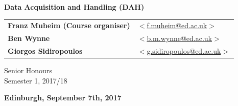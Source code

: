 \vspace{1cm}

\begin{center}
\end{center}

\vspace{1cm}

\begin{center}
{\LARGE\bf Data Acquisition and Handling (DAH)}
\end{center}

\begin{center}

\vspace{2cm}

\begin{tabular}{ll}
{\Large{\bf Franz Muheim (Course organiser)}} & \hspace*{5mm}\href{mailto:f.muheim@ed.ac.uk}{$<$f.muheim@ed.ac.uk$>$} \\
{\Large {\bf Ben Wynne} } & \hspace*{5mm} \href{mailto:b.m.wynne@ed.ac.uk}{$<$b.m.wynne@ed.ac.uk$>$} \\

{\Large{\bf Giorgos Sidiropoulos} }& \hspace*{5mm} \href{mailto:g.sidiropoulos@ed.ac.uk}{$<$g.sidiropoulos@ed.ac.uk$>$} \\
\end{tabular}

\vspace{2cm}
{\Large Senior Honours} \\
{\Large Semester 1, 2017/18} \\

\vspace{2cm}


{\large\bf Edinburgh, September 7th, 2017}
\end{center}


